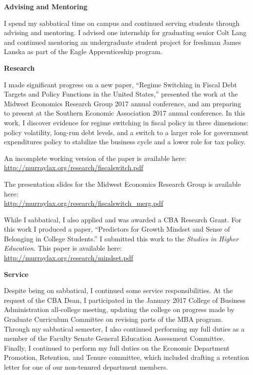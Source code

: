 \documentclass[11pt]{article}
\begin{document}
\textbf{Advising and Mentoring}

I spend my sabbatical time on campus and continued serving students through advising and mentoring.  I advised one internship for graduating senior Colt Lang and continued mentoring an undergraduate student project for freshman James Lanska as part of the Eagle Apprenticeship program.

\textbf{Research}

I made significant progress on a new paper, ``Regime Switching in Fiscal Debt Targets and Policy Functions in the United States,'' presented the work at the Midwest Economics Research Group 2017 annual conference, and am preparing to present at the Southern Economic Association 2017 annual conference.  In this work, I discover evidence for regime switching in fiscal policy in three dimensions: policy volatility, long-run debt levels, and a switch to a larger role for government expenditures policy to stabilize the business cycle and a lower role for tax policy.

An incomplete working version of the paper is available here:\\ \url{http://murraylax.org/research/fiscalswitch.pdf}

The presentation slides for the Midwest Economics Research Group is available here:\\ \url{http://murraylax.org/research/fiscalswitch_merg.pdf}

While I sabbatical, I also applied and was awarded a CBA Research Grant.  For this work I produced a paper, ``Predictors for Growth Mindset and Sense of Belonging in College Students.'' I submitted this work to the \textit{Studies in Higher Education}. This paper is available here: \url{http://murraylax.org/research/mindset.pdf}

\textbf{Service}

Despite being on sabbatical, I continued some service responsibilities.  At the request of the CBA Dean, I participated in the January 2017 College of Business Administration all-college meeting, updating the college on progress made by Graduate Curriculum Committee on revising parts of the MBA program. Through my sabbatical semester, I also continued performing my full duties as a member of the Faculty Senate General Education Assessment Committee. Finally, I continued to perform my full duties on the Economic Department Promotion, Retention, and Tenure committee, which included drafting a retention letter for one of our non-tenured department members.
\end{document}
